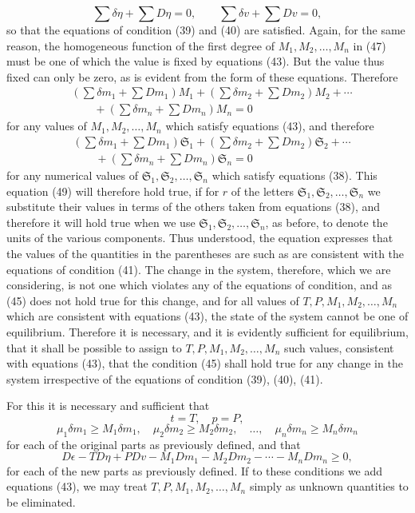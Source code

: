 \documentclass[11pt]{article}
\newcommand{\unit}[1]{\mathfrak{S}_{#1}}
\begin{document}
\[
\sum\delta\eta+\sum D\eta=0,\qquad
\sum\delta v+\sum Dv=0,
\]
so that the equations of condition (39) and (40) are satisfied. Again, for the same reason, the homogeneous function of the first degree of \(M_1,M_2,\ldots,M_n\) in (47) must be one of which the value is fixed by equations (43). But the value thus fixed can only be zero, as is evident from the form of these equations. Therefore
\begin{equation}
\begin{aligned}
&(\sum\delta m_1+\sum Dm_1)M_1
+(\sum\delta m_2+\sum Dm_2)M_2+\cdots\\
&\qquad
+(\sum\delta m_n+\sum Dm_n)M_n=0
\end{aligned}
\end{equation}
for any values of \(M_1,M_2,\ldots,M_n\) which satisfy equations (43), and therefore
\begin{equation}
\begin{aligned}
&(\sum\delta m_1+\sum Dm_1)\unit{1}
+(\sum\delta m_2+\sum Dm_2)\unit{2}+\cdots\\
&\qquad
+(\sum\delta m_n+\sum Dm_n)\unit{n}=0
\end{aligned}
\end{equation}
for any numerical values of \(\unit{1},\unit{2},\ldots,\unit{n}\) which satisfy equations (38). This equation (49) will therefore hold true, if for \(r\) of the letters \(\unit{1},\unit{2},\ldots,\unit{n}\) we substitute their values in terms of the others taken from equations (38), and therefore it will hold true when we use \(\unit{1},\unit{2},\ldots,\unit{n}\), as before, to denote the units of the various components. Thus understood, the equation expresses that the values of the quantities in the parentheses are such as are consistent with the equations of condition (41). The change in the system, therefore, which we are considering, is not one which violates any of the equations of condition, and as (45) does not hold true for this change, and for all values of \(T,P,M_1,M_2,\ldots,M_n\) which are consistent with equations (43), the state of the system cannot be one of equilibrium. Therefore it is necessary, and it is evidently sufficient for equilibrium, that it shall be possible to assign to \(T,P,M_1,M_2,\ldots,M_n\) such values, consistent with equations (43), that the condition (45) shall hold true for any change in the system irrespective of the equations of condition (39), (40), (41).

For this it is necessary and sufficient that
\begin{equation}
t=T,\quad p=P,
\end{equation}
\begin{equation}
\mu_1\delta m_1\geq M_1\delta m_1,\quad
\mu_2\delta m_2\geq M_2\delta m_2,\quad \ldots,\quad
\mu_n\delta m_n\geq M_n\delta m_n
\end{equation}
for each of the original parts as previously defined, and that
\begin{equation}
D\epsilon-TD\eta+PDv-M_1Dm_1-M_2Dm_2-\cdots-M_nDm_n\geq 0,
\end{equation}
for each of the new parts as previously defined. If to these conditions we add equations (43), we may treat \(T,P,M_1,M_2,\ldots,M_n\) simply as unknown quantities to be eliminated.
\end{document}
